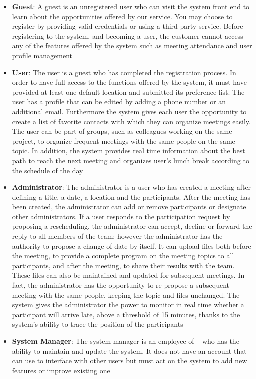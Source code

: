 \begin{itemize}
	\item \textbf{{\large Guest}}: A guest is an unregistered user who can visit the system front end to learn about the opportunities offered by our service. You may choose to register by providing valid credentials or using a third-party service. Before registering to the system, and becoming a user, the customer cannot access any of the features offered by the system such as meeting attendance and user profile management
	\item \textbf{{\large User}}: The user is a guest who has completed the registration process. In order to have full access to the functions offered by the system, it must have provided at least one default location and submitted its preference list. The user has a profile that can be edited by adding a phone number or an additional email. Furthermore the system gives each user the opportunity to create a list of favorite contacts with which they can organize meetings easily. The user can be part of groups, such as colleagues working on the same project, to organize frequent meetings with the same people on the same topic. In addition, the system provides real time information about the best path to reach the next meeting and organizes user's lunch break according to the schedule of the day
	\item \textbf{{\large Administrator}}: The administrator is a user who has created a meeting after defining a title, a date, a location and the participants.  After the meeting has been created, the administrator can add or remove participants or designate other administrators. If a user responds to the participation request by proposing a rescheduling, the administrator can accept, decline or forward the reply to all members of the team; however the administrator has the authority to propose a change of date by itself. \newline
	It can upload files both before the meeting, to provide a complete program on the meeting topics to all participants, and after the meeting, to share their results with the team. These files can also be maintained and updated for subsequent meetings.  In fact, the administrator has the opportunity to re-propose a subsequent meeting with the same people, keeping the topic and files unchanged. \newline
	The system gives the administrator the power to monitor in real time whether a participant will arrive late, above a threshold of 15 minutes, thanks to the system's ability to trace the position of the participants
	\item \textbf{{\large System Manager}}: The system manager is an employee of \projectname~  who has the ability to maintain and update the system. It does not have an account that can use to interface with other users but must act on the system to add new features or improve existing one
\end{itemize}
